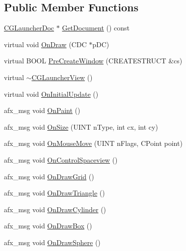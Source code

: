 \subsection*{Public Member Functions}
\begin{DoxyCompactItemize}
\item 
\hyperlink{class_c_g_launcher_doc}{C\+G\+Launcher\+Doc} $\ast$ \hyperlink{class_c_g_launcher_view_aee831a65eaafdc54e12f3df9893dc634}{Get\+Document} () const 
\item 
virtual void \hyperlink{class_c_g_launcher_view_a329f1664430248e1d6d88510c1b928b7}{On\+Draw} (C\+D\+C $\ast$p\+D\+C)
\item 
virtual B\+O\+O\+L \hyperlink{class_c_g_launcher_view_a6019657dec65c1877860d774a3a62531}{Pre\+Create\+Window} (C\+R\+E\+A\+T\+E\+S\+T\+R\+U\+C\+T \&cs)
\item 
virtual \hyperlink{class_c_g_launcher_view_a71a840a8be513d30d7ceb6d4ca706473}{$\sim$\+C\+G\+Launcher\+View} ()
\item 
virtual void \hyperlink{class_c_g_launcher_view_ab1f4ecff2ef12efafccb06d91eaa993f}{On\+Initial\+Update} ()
\item 
afx\+\_\+msg void \hyperlink{class_c_g_launcher_view_a353f59cfd429accb4563696da71768ec}{On\+Paint} ()
\item 
afx\+\_\+msg void \hyperlink{class_c_g_launcher_view_a3169f2fc3c874abe21a28bb8e508db95}{On\+Size} (U\+I\+N\+T n\+Type, int cx, int cy)
\item 
afx\+\_\+msg void \hyperlink{class_c_g_launcher_view_abc13141559d192abb64eec467b2e7f4b}{On\+Mouse\+Move} (U\+I\+N\+T n\+Flags, C\+Point point)
\item 
afx\+\_\+msg void \hyperlink{class_c_g_launcher_view_a60ab853f42bf7f84b1a18da5308bff91}{On\+Control\+Spaceview} ()
\item 
afx\+\_\+msg void \hyperlink{class_c_g_launcher_view_a10059c5f5f4c3a3c31637654c7498edc}{On\+Draw\+Grid} ()
\item 
afx\+\_\+msg void \hyperlink{class_c_g_launcher_view_a0b35fccb39eea2e426d681a07bbf4728}{On\+Draw\+Triangle} ()
\item 
afx\+\_\+msg void \hyperlink{class_c_g_launcher_view_a3fadfb27afe1ef701cf5f05bebcba658}{On\+Draw\+Cylinder} ()
\item 
afx\+\_\+msg void \hyperlink{class_c_g_launcher_view_adf5a04aab8010c69d0174f84692b0369}{On\+Draw\+Box} ()
\item 
afx\+\_\+msg void \hyperlink{class_c_g_launcher_view_a522495b2d947b31dcaff56f984108d6b}{On\+Draw\+Sphere} ()

\end{DoxyCompactItemize}
